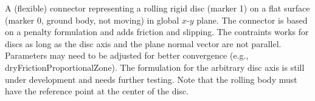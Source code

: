 \ei

%
\newpage


\label{sec:item:ObjectConnectorRollingDiscPenalty}
A (flexible) connector representing a rolling rigid disc (marker 1) on a flat surface (marker 0, ground body, not moving) in global $x$-$y$ plane. The connector is based on a penalty formulation and adds friction and slipping. The contraints works for discs as long as the disc axis and the plane normal vector are not parallel. Parameters may need to be adjusted for better convergence (e.g., dryFrictionProportionalZone). The formulation for the arbitrary disc axis is still under development and needs further testing. Note that the rolling body must have the reference point at the center of the disc.
\vspace{12pt}\\

